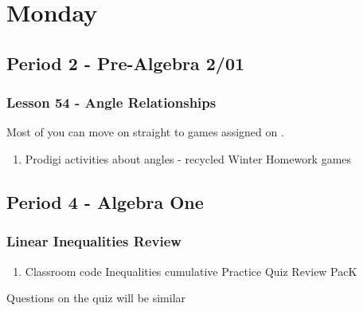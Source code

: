    \section[Mon]{Monday}
   \subsection[PA2/01]{Period 2 - Pre-Algebra 2/01}
   \begin{frame}[label=PA2_01]
   	\frametitle{Lesson 54 - Angle Relationships}   	
    
   \begin{alertblock}{}
   	Most of you can move on straight to  games assigned on \mangahightext. \\
   \end{alertblock}
    
      \begin{enumerate}
        \item \mangahightext
        \rightarrowitem Prodigi activities about angles - recycled Winter Homework
        \rightarrowitem {} games
      \end{enumerate}
   	  \end{frame}
   	  
     \subsection[ALG]{Period 4 - Algebra One}
   	 \begin{frame}[label=ALG1]
   	 	\frametitle{Linear Inequalities Review}   	
    
      \begin{enumerate}
   	    \item {} Classroom code 
        \rightarrowitem Inequalities cumulative Practice
        \rightarrowitem Quiz Review PacK
      \end{enumerate}
      
      \begin{alertblock}{}
        Questions on the quiz will be similar	
     \end{alertblock}
   	  \end{frame}
   	 
